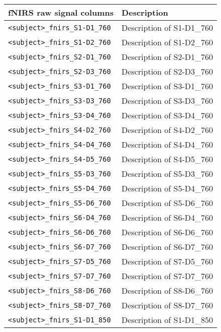 \begin{table}
\centering
\begin{tabularx}{\textwidth}{|l|X|}
\hline
\textbf{fNIRS raw signal columns} & \textbf{Description} \\
\hline
\texttt{<subject>\_fnirs\_S1-D1\_760} & Description of S1-D1\_760 \\
\hline
\texttt{<subject>\_fnirs\_S1-D2\_760} & Description of S1-D2\_760 \\
\hline
\texttt{<subject>\_fnirs\_S2-D1\_760} & Description of S2-D1\_760 \\
\hline
\texttt{<subject>\_fnirs\_S2-D3\_760} & Description of S2-D3\_760 \\
\hline
\texttt{<subject>\_fnirs\_S3-D1\_760} & Description of S3-D1\_760 \\
\hline
\texttt{<subject>\_fnirs\_S3-D3\_760} & Description of S3-D3\_760 \\
\hline
\texttt{<subject>\_fnirs\_S3-D4\_760} & Description of S3-D4\_760 \\
\hline
\texttt{<subject>\_fnirs\_S4-D2\_760} & Description of S4-D2\_760 \\
\hline
\texttt{<subject>\_fnirs\_S4-D4\_760} & Description of S4-D4\_760 \\
\hline
\texttt{<subject>\_fnirs\_S4-D5\_760} & Description of S4-D5\_760 \\
\hline
\texttt{<subject>\_fnirs\_S5-D3\_760} & Description of S5-D3\_760 \\
\hline
\texttt{<subject>\_fnirs\_S5-D4\_760} & Description of S5-D4\_760 \\
\hline
\texttt{<subject>\_fnirs\_S5-D6\_760} & Description of S5-D6\_760 \\
\hline
\texttt{<subject>\_fnirs\_S6-D4\_760} & Description of S6-D4\_760 \\
\hline
\texttt{<subject>\_fnirs\_S6-D6\_760} & Description of S6-D6\_760 \\
\hline
\texttt{<subject>\_fnirs\_S6-D7\_760} & Description of S6-D7\_760 \\
\hline
\texttt{<subject>\_fnirs\_S7-D5\_760} & Description of S7-D5\_760 \\
\hline
\texttt{<subject>\_fnirs\_S7-D7\_760} & Description of S7-D7\_760 \\
\hline
\texttt{<subject>\_fnirs\_S8-D6\_760} & Description of S8-D6\_760 \\
\hline
\texttt{<subject>\_fnirs\_S8-D7\_760} & Description of S8-D7\_760 \\
\hline
\texttt{<subject>\_fnirs\_S1-D1\_850} & Description of S1-D1\_850 \\

\end{tabularx}
\end{table}
